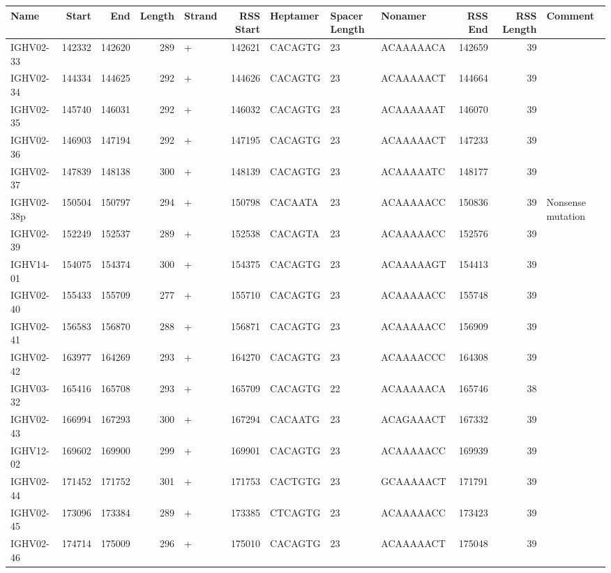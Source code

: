 \begin{tabular}{lrrrlrlllrrl}
  \toprule Name & Start & End & Length & Strand & RSS Start & Heptamer & Spacer Length & Nonamer & RSS End & RSS Length & Comment \\ 
  \midrule IGHV02-33 & 142332 & 142620 & 289 & + & 142621 & CACAGTG & 23 & ACAAAAACA & 142659 & 39 &  \\ 
  IGHV02-34 & 144334 & 144625 & 292 & + & 144626 & CACAGTG & 23 & ACAAAAACT & 144664 & 39 &  \\ 
  IGHV02-35 & 145740 & 146031 & 292 & + & 146032 & CACAGTG & 23 & ACAAAAAAT & 146070 & 39 &  \\ 
  IGHV02-36 & 146903 & 147194 & 292 & + & 147195 & CACAGTG & 23 & ACAAAAACT & 147233 & 39 &  \\ 
  IGHV02-37 & 147839 & 148138 & 300 & + & 148139 & CACAGTG & 23 & ACAAAAATC & 148177 & 39 &  \\ 
  IGHV02-38p & 150504 & 150797 & 294 & + & 150798 & CACAATA & 23 & ACAAAAACC & 150836 & 39 & Nonsense mutation \\ 
  IGHV02-39 & 152249 & 152537 & 289 & + & 152538 & CACAGTA & 23 & ACAAAAACC & 152576 & 39 &  \\ 
  IGHV14-01 & 154075 & 154374 & 300 & + & 154375 & CACAGTG & 23 & ACAAAAAGT & 154413 & 39 &  \\ 
  IGHV02-40 & 155433 & 155709 & 277 & + & 155710 & CACAGTG & 23 & ACAAAAACC & 155748 & 39 &  \\ 
  IGHV02-41 & 156583 & 156870 & 288 & + & 156871 & CACAGTG & 23 & ACAAAAACC & 156909 & 39 &  \\ 
  IGHV02-42 & 163977 & 164269 & 293 & + & 164270 & CACAGTG & 23 & ACAAAACCC & 164308 & 39 &  \\ 
  IGHV03-32 & 165416 & 165708 & 293 & + & 165709 & CACAGTG & 22 & ACAAAAACA & 165746 & 38 &  \\ 
  IGHV02-43 & 166994 & 167293 & 300 & + & 167294 & CACAATG & 23 & ACAGAAACT & 167332 & 39 &  \\ 
  IGHV12-02 & 169602 & 169900 & 299 & + & 169901 & CACAGTG & 23 & ACAAAAACC & 169939 & 39 &  \\ 
  IGHV02-44 & 171452 & 171752 & 301 & + & 171753 & CACTGTG & 23 & GCAAAAACT & 171791 & 39 &  \\ 
  IGHV02-45 & 173096 & 173384 & 289 & + & 173385 & CTCAGTG & 23 & ACAAAAACC & 173423 & 39 &  \\ 
  IGHV02-46 & 174714 & 175009 & 296 & + & 175010 & CACAGTG & 23 & ACAAAAACT & 175048 & 39 &  \\ 

\end{tabular}
